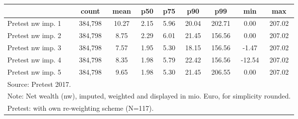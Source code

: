 {
\def\sym#1{\ifmmode^{#1}\else\(^{#1}\)\fi}
\begin{tabular}{l*{1}{cccccccc}}
\hline\hline
                                            &       count&        mean&         p50&         p75&         p90&         p99&         min&         max\\
\hline
Pretest nw imp. 1                           &     384,798&       10.27&        2.15&        5.96&       20.04&      202.71&        0.00&      207.02\\
Pretest nw imp. 2                           &     384,798&        8.75&        2.29&        6.01&       21.45&      156.56&        0.00&      207.02\\
Pretest nw imp. 3                           &     384,798&        7.57&        1.95&        5.30&       18.15&      156.56&       -1.47&      207.02\\
Pretest nw imp. 4                           &     384,798&        8.35&        1.98&        5.79&       22.42&      156.56&      -12.54&      207.02\\
Pretest nw imp. 5                           &     384,798&        9.65&        1.98&        5.30&       21.45&      206.55&        0.00&      207.02\\
\hline\hline
\multicolumn{9}{l}{\footnotesize Source: Pretest 2017.}\\
\multicolumn{9}{l}{\footnotesize Note: Net wealth (nw), imputed, weighted and displayed in mio. Euro, for simplicity rounded.}\\
\multicolumn{9}{l}{\footnotesize Pretest: with own re-weighting scheme (N=117).}\\
\end{tabular}
}
